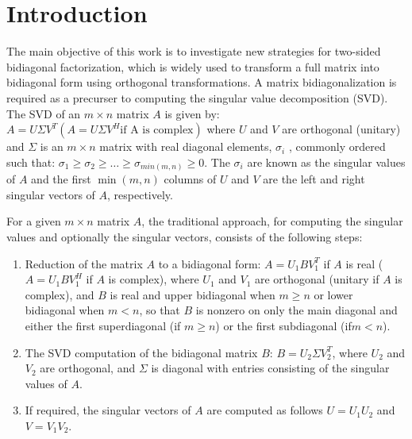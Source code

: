 \section{Introduction}
The main objective of this work is to investigate new strategies for
two-sided bidiagonal factorization,
which is widely used to
transform a full matrix into bidiagonal form using orthogonal transformations.
A matrix bidiagonalization is required as a precurser to computing the
singular value decomposition (SVD).
The SVD of an $m\times n$ matrix $A$ is given by:
$A = U \Sigma V^T (A = U \Sigma V^H \text{if A is complex})$ where
$U$ and $V$ are orthogonal (unitary) and $\Sigma$ is an $m\times n$
matrix with real diagonal elements, $\sigma_i$ , commonly ordered such
that: $\sigma_1 \ge \sigma_2 \ge \dots \ge \sigma_{min(m,n)} \ge 0.$
The $\sigma_i$ are known as the singular values of $A$
and the first $\min(m, n)$ columns
of $U$ and $V$ are the left and right singular vectors of $A$, respectively.

For a given $m\times n$ matrix $A$,
the traditional approach, for computing the singular
values and optionally the singular vectors,
consists of the following steps:
\begin{enumerate}
\item Reduction of the matrix $A$ to a bidiagonal form: $A =
  U_1BV^T_1$ if $A$ is real ($A = U_1BV^H_1$ if $A$ is complex), where
  $U_1$ and $V_1$ are orthogonal (unitary if $A$ is complex), and $B$ is
  real and upper bidiagonal when $m \ge n$ or lower bidiagonal when $m < n$,
  so that $B$ is nonzero on only the main diagonal and either the first
  superdiagonal (if $m \ge n$) or the first subdiagonal (if$ m < n$).

\item The SVD computation of the bidiagonal matrix $B$: $B = U_2 \Sigma
  V_2^T$, where $U_2$ and $V_2$ are orthogonal, and $\Sigma$ is
  diagonal with entries consisting of the singular values of $A$.
\item If required, the singular vectors of $A$ are computed as
  follows $U = U_1U_2$ and $V = V_1 V_2$.
\end{enumerate}

